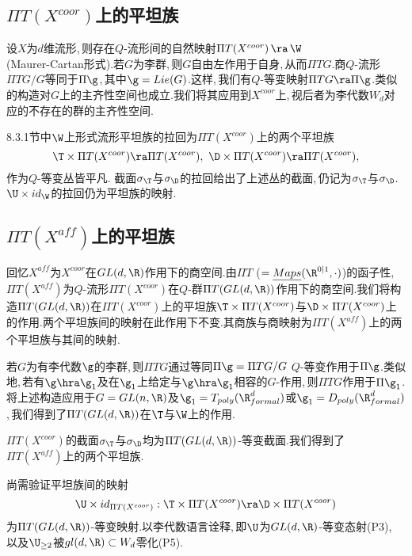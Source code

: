 \subsection{$\Pi T(X^{coor})$上的平坦族}

设$X$为$d$维流形,\,则存在$Q$-流形间的自然映射$\Pi T(X^{coor})\,\ra \,\W$\\(Maurer-Cartan形式).若$G$为李群,\,则$G$自由左作用于自身,\,从而$\Pi TG$.商$Q$-流形$\Pi TG/G$等同于$\Pi \g$,\,其中$\g=Lie(G)$.这样,\,我们有$Q$-等变映射$\Pi TG\ra \Pi \g$.类似的构造对$G$上的主齐性空间也成立.我们将其应用到$X^{coor}$上,\,视后者为李代数$W_d$对应的不存在的群的主齐性空间.

8.3.1节中$\W$上形式流形平坦族的拉回为$\Pi T ( X^{coor})$上的两个平坦族
$$\T\times \Pi T (X^{coor})\ra \Pi T (X^{coor}),\,\,\D\times \Pi T (X^{coor})\ra \Pi T (X^{coor}),$$
作为$Q$-等变丛皆平凡.
截面$\sigma_\T$与$\sigma_\D$的拉回给出了上述丛的截面,\,仍记为$\sigma_\T$与$\sigma_\D$.\,\,$\U\times id_\W$的拉回仍为平坦族的映射.



\subsection{$\Pi T (X^{aff})$上的平坦族}

回忆$X^{aff}$为$X^{coor}$在$GL(d,\R)$作用下的商空间.由$\Pi T$ ($=\underline{Maps}(\R^{0|1},\cdot)$)的函子性,\,\,$\Pi T (X^{aff})$为$Q$-流形$\Pi T (X^{coor})$在$Q$-群$\Pi T (GL(d,\R))$作用下的商空间.我们将构造$\Pi T (GL(d,\R))$在$\Pi T (X^{coor})$上的平坦族$\T\times \Pi T (X^{coor})$与$\D\times \Pi T (X^{coor})$上的作用.两个平坦族间的映射在此作用下不变.其商族与商映射为$\Pi T (X^{aff})$上的两个平坦族与其间的映射.

若$G$为有李代数$\g$的李群,\,则$\Pi T G$通过等同$\Pi \g=\Pi TG/G$\,\,$Q$-等变作用于$\Pi \g$.类似地,\,若有$\g\hra\g_1$及在$\g_1$上给定与$\g\hra\g_1$相容的$G$-作用,\,则$\Pi T G$作用于$\Pi \g_1$.将上述构造应用于$G=GL(n,\R)$及$\g_1=T_{poly}(\R^d_{formal})$或$\g_1=D_{poly}(\R^d_{formal})$,\,我们得到了$\Pi T (GL(d,\R))$在$\T$与$\W$上的作用.

$\Pi T (X^{coor})$的截面$\sigma_\T$与$\sigma_\D$均为$\Pi T (GL(d,\R))$-等变截面.我们得到了\\$\Pi T( X^{aff})$上的两个平坦族.

尚需验证平坦族间的映射
$$\U\times   id_{\Pi T (X^{coor})}:\T \times  \Pi T (X^{coor})\ra  \D\times \Pi T (X^{coor})$$
为$\Pi T (GL(d,\R))$-等变映射.以李代数语言诠释,\,即$\U$为$GL(d,\R)$-等变态射(P3),\,\,\\以及$\U_{\ge 2}$被$gl(d,\R)\subset  W_d$零化(P5).


